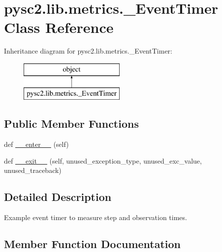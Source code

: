 \hypertarget{classpysc2_1_1lib_1_1metrics_1_1___event_timer}{}\section{pysc2.\+lib.\+metrics.\+\_\+\+Event\+Timer Class Reference}
\label{classpysc2_1_1lib_1_1metrics_1_1___event_timer}
Inheritance diagram for pysc2.\+lib.\+metrics.\+\_\+\+Event\+Timer\+:\begin{figure}[H]
\begin{center}
\leavevmode
\includegraphics[height=2.000000cm]{classpysc2_1_1lib_1_1metrics_1_1___event_timer}
\end{center}
\end{figure}
\subsection*{Public Member Functions}
\begin{DoxyCompactItemize}
\item 
def \mbox{\hyperlink{classpysc2_1_1lib_1_1metrics_1_1___event_timer_a57a5b0557d7da12374767386bf2ba818}{\+\_\+\+\_\+enter\+\_\+\+\_\+}} (self)
\item 
def \mbox{\hyperlink{classpysc2_1_1lib_1_1metrics_1_1___event_timer_a41da3f624cce120628f8f6a2d1ec3a2c}{\+\_\+\+\_\+exit\+\_\+\+\_\+}} (self, unused\+\_\+exception\+\_\+type, unused\+\_\+exc\+\_\+value, unused\+\_\+traceback)
\end{DoxyCompactItemize}


\subsection{Detailed Description}
\begin{DoxyVerb}Example event timer to measure step and observation times.\end{DoxyVerb}
 

\subsection{Member Function Documentation}
\mbox{\label{classpysc2_1_1lib_1_1metrics_1_1___event_timer_a57a5b0557d7da12374767386bf2ba818}} 
